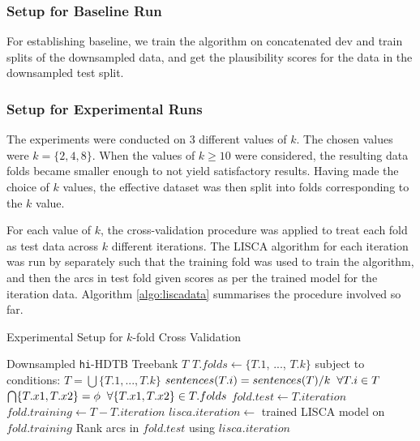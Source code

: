 \subsubsection{Setup for Baseline Run}

For establishing baseline, we train the algorithm on concatenated dev and train splits of the downsampled data, and get the plausibility scores for the data in the downsampled test split.

\subsubsection{Setup for Experimental Runs}

The experiments were conducted on 3 different values of \(k\). The chosen values were \(k = \{2, 4, 8\}\). When the values of \( k \geq 10\) were considered, the resulting data folds became smaller enough to not yield satisfactory results. Having made the choice of \(k\) values, the effective dataset was then split into folds corresponding to the \(k\) value.

For each value of \(k\), the cross-validation procedure was applied to treat each fold as test data across \(k\) different iterations. The LISCA algorithm for each iteration was run by \citeauthor{lisca} separately such that the training fold was used to train the algorithm, and then the arcs in test fold given scores as per the trained model for the iteration data. Algorithm \ref{algo:liscadata} summarises the procedure involved so far.

\begin{algorithm}[H]
\caption{Experimental Setup for \(k\)-fold Cross Validation}
\label{algo:liscadata}
    \begin{algorithmic}[1]
    \REQUIRE Downsampled \texttt{hi}-HDTB Treebank $T$
        \STATE $T.folds \leftarrow \{T.1$, ..., $T.k\}$ subject to conditions:
        \STATE $T = \bigcup \{T.1, ..., T.k\}$ 
        \STATE $sentences(T.i) = sentences(T)/k \hspace{2mm} \forall T.i \in T$
        \STATE $\bigcap \{T.x1, T.x2\} = \phi \hspace{2mm} \forall \{T.x1, T.x2\}  \in T.folds$ 
            \STATE $fold.test \leftarrow T.iteration$
            \STATE $fold.training \leftarrow T - T.iteration$
            \STATE $lisca.iteration \leftarrow$ trained LISCA model on $fold.training$
            \STATE Rank arcs in $fold.test$ using $lisca.iteration$
        \ENDFOR
    \ENDFOR
    \end{algorithmic}
\end{algorithm}

